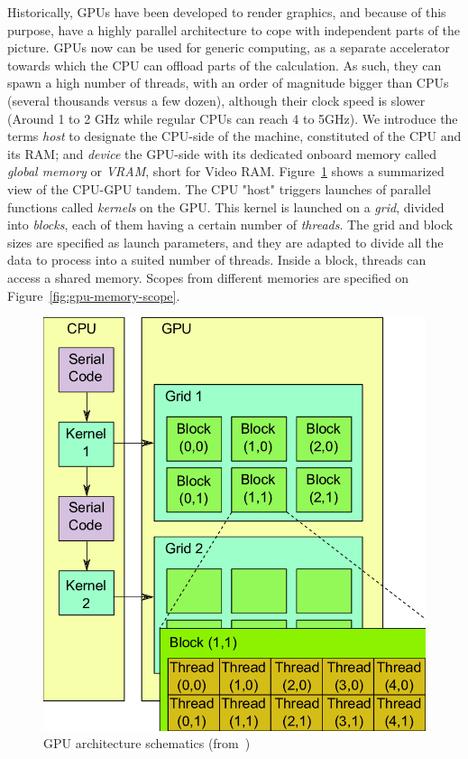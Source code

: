 Historically, GPUs have been developed to render graphics, and because of this purpose, have a highly parallel architecture to cope with independent parts of the picture. GPUs now can be used for generic computing, as a separate accelerator towards which the CPU can offload parts of the calculation. As such, they can spawn a high number of threads, with an order of magnitude bigger than CPUs (several thousands versus a few dozen), although their clock speed is slower (Around 1 to 2 GHz while regular CPUs can reach 4 to 5GHz). We introduce the terms \emph{host} to designate the CPU-side of the machine, constituted of the CPU and its RAM; and \emph{device} the GPU-side with its dedicated onboard memory called \emph{global memory} or \emph{VRAM}, short for Video RAM. Figure~\ref{fig:gpu-arch} shows a summarized view of the CPU-GPU tandem. The CPU "host" triggers launches of parallel functions called \emph{kernels} on the GPU. This kernel is launched on a \emph{grid}, divided into \emph{blocks}, each of them having a certain number of \emph{threads}. The grid and block sizes are specified as launch parameters, and they are adapted to divide all the data to process into a suited number of threads. Inside a block, threads can access a shared memory. Scopes from different memories are specified on Figure~\ref{fig:gpu-memory-scope}.

\begin{figure}[h]
	\centering
	\includegraphics[width=0.6\linewidth]{gpu-arch}
	\caption{GPU architecture schematics (from~\cite{Bartezzaghi:gpu-arch})}
	\label{fig:gpu-arch}
\end{figure}



